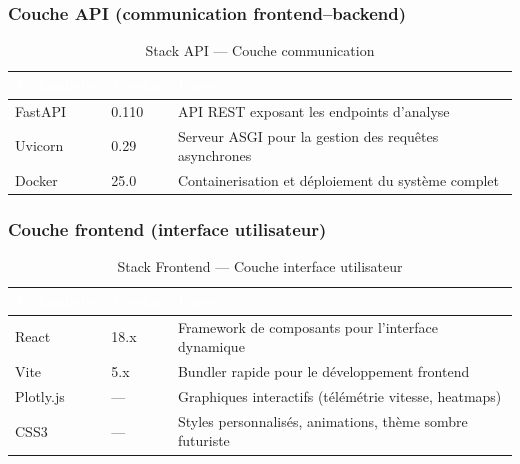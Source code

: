 \subsubsection*{Couche API (communication frontend–backend)}
 
\begin{table}[H]
  \centering
  \tablestyle
  \begin{tabularx}{\textwidth}{L{2.8cm} C{2cm} X}
    \toprule
    \textcolor{white}{\textbf{Technologie}} & \textcolor{white}{\textbf{Version}} & \textcolor{white}{\textbf{Usage}} \\
    \midrule
    FastAPI & 0.110 & API REST exposant les endpoints d'analyse \\
    Uvicorn & 0.29 & Serveur ASGI pour la gestion des requêtes asynchrones \\
    Docker & 25.0 & Containerisation et déploiement du système complet \\
    \bottomrule
  \end{tabularx}
  \caption{Stack API — Couche communication}
  \label{tab:stack_api}
\end{table}
 
\subsubsection*{Couche frontend (interface utilisateur)}
 
\begin{table}[H]
  \centering
  \tablestyle
  \begin{tabularx}{\textwidth}{L{2.8cm} C{2cm} X}
    \toprule
    \textcolor{white}{\textbf{Technologie}} & \textcolor{white}{\textbf{Version}} & \textcolor{white}{\textbf{Usage}} \\
    \midrule
    React & 18.x & Framework de composants pour l'interface dynamique \\
    Vite & 5.x & Bundler rapide pour le développement frontend \\
    Plotly.js & — & Graphiques interactifs (télémétrie vitesse, heatmaps) \\
    CSS3 & — & Styles personnalisés, animations, thème sombre futuriste \\
    \bottomrule
  \end{tabularx}
  \caption{Stack Frontend — Couche interface utilisateur}
  \label{tab:stack_frontend}
\end{table}
 
